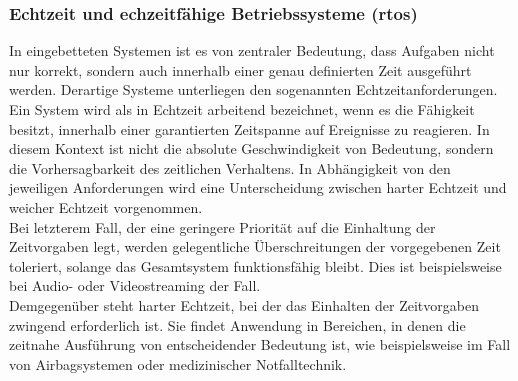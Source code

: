%
%

\subsubsection*{Echtzeit und echzeitfähige Betriebssysteme (\gls{rtos})}
In eingebetteten Systemen ist es von zentraler Bedeutung, dass Aufgaben nicht nur korrekt, sondern auch innerhalb einer genau definierten Zeit ausgeführt werden.
Derartige Systeme unterliegen den sogenannten Echtzeitanforderungen.
Ein System wird als in Echtzeit arbeitend bezeichnet, wenn es die Fähigkeit besitzt, innerhalb einer garantierten Zeitspanne auf Ereignisse zu reagieren.
In diesem Kontext ist nicht die absolute Geschwindigkeit von Bedeutung, sondern die Vorhersagbarkeit des zeitlichen Verhaltens.
In Abhängigkeit von den jeweiligen Anforderungen wird eine Unterscheidung zwischen harter Echtzeit und weicher Echtzeit vorgenommen. \\
Bei letzterem Fall, der eine geringere Priorität auf die Einhaltung der Zeitvorgaben legt, werden gelegentliche Überschreitungen der vorgegebenen Zeit toleriert, solange das Gesamtsystem funktionsfähig bleibt.
Dies ist beispielsweise bei Audio- oder Videostreaming der Fall. \\
Demgegenüber steht harter Echtzeit, bei der das Einhalten der Zeitvorgaben zwingend erforderlich ist. 
Sie findet Anwendung in Bereichen, in denen die zeitnahe Ausführung von entscheidender Bedeutung ist, wie beispielsweise im Fall von Airbagsystemen oder medizinischer Notfalltechnik.

